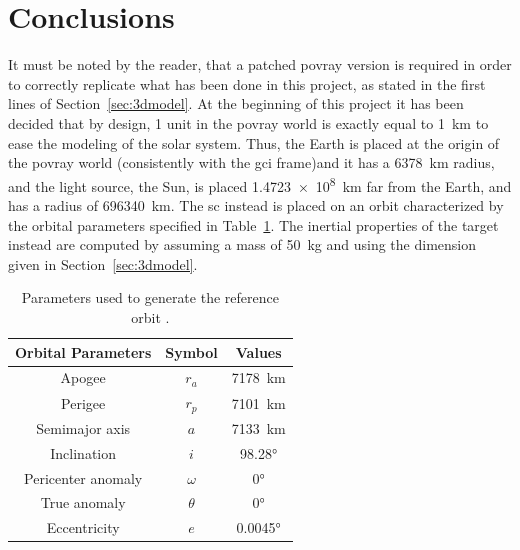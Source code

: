 \section{Conclusions}
It must be noted by the reader, that a patched \acrshort{povray} version is required in order to correctly replicate what has been done in this project, as stated in the first lines of Section~\ref{sec:3dmodel}. At the beginning of this project it has been decided that by design, 1 unit in the \acrshort{povray} world is exactly equal to \SI{1}{\km} to ease the modeling of the solar system. Thus, the Earth is placed at the origin of the \acrshort{povray} world (consistently with the \acrshort{gci} frame)and it has a \SI{6378}{\km} radius, and the light source, the Sun, is placed \SI{1.4723e8}{\km} far from the Earth, and has a radius of \SI{696340}{\km}.
The \acrshort{sc} instead is placed on an orbit characterized by the orbital parameters specified in Table~\ref{tab:orbitalParameters}. The inertial properties of the target instead are computed by assuming a mass of \SI{50}{\kg} and using the dimension given in Section~\ref{sec:3dmodel}.

\begin{table}[htbp]
  \centering
  \begin{tabular}{ccc}
    \hline
    \hline
    Orbital Parameters & Symbol   & Values         \\
    \hline
    Apogee             & $r_a$    & \SI{7178}{\km} \\
    \hline
    Perigee            & $r_p$    & \SI{7101}{\km} \\
    \hline
    Semimajor axis     & $a$      & \SI{7133}{\km} \\
    \hline
    Inclination        & $i$      & \ang{98.28}    \\
    \hline
    Pericenter anomaly & $\omega$ & \ang{0}        \\
    \hline
    True anomaly       & $\theta$ & \ang{0}        \\
    \hline
    Eccentricity       & $e$      & \ang{0.0045}   \\
    \hline
    \hline
  \end{tabular}
  \caption{Parameters used to generate the reference orbit \cite{prismaOrbitParameters}.}
  \label{tab:orbitalParameters}
\end{table}

